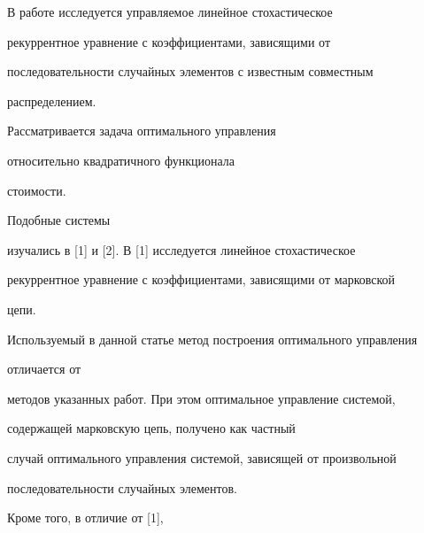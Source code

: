 

 


\pagestyle{plain} %


 


 




 


\maketitle 


 





В работе исследуется управляемое линейное стохастическое


рекуррентное уравнение с коэффициентами, зависящими от


последовательности случайных элементов с известным совместным


распределением.


Рассматривается задача оптимального управления


относительно квадратичного функционала


стоимости.





Подобные системы


изучались в [1] и [2]. В [1] исследуется линейное стохастическое


рекуррентное уравнение с коэффициентами, зависящими от марковской


цепи.





Используемый в данной статье метод построения оптимального управления


отличается от


методов указанных работ. При этом оптимальное управление системой,


содержащей марковскую цепь, получено как частный


случай оптимального управления системой, зависящей от произвольной


последовательности случайных элементов.


Кроме того, в отличие от [1],


